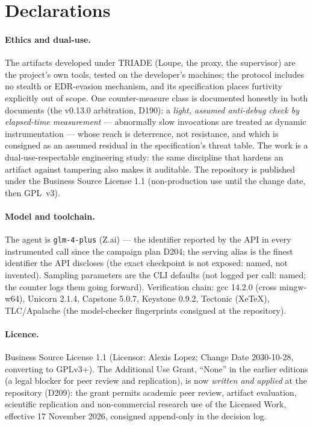 \documentclass[11pt,a4paper]{article}
\newcommand{\code}[1]{\texttt{\small #1}}
\begin{document}
\section*{Declarations}

\paragraph{Ethics and dual-use.} The artifacts developed under TRIADE
(Loupe, the proxy, the supervisor) are the project's own tools, tested on
the developer's machines; the protocol includes no stealth or
EDR-evasion mechanism, and its specification places furtivity explicitly
out of scope. One counter-measure class is documented honestly in both
documents (the v0.13.0 arbitration, D190): a \emph{light, assumed
anti-debug check by elapsed-time measurement} --- abnormally slow
invocations are treated as dynamic instrumentation --- whose reach is
deterrence, not resistance, and which is consigned as an assumed residual
in the specification's threat table. The work is a dual-use-respectable
engineering study: the same discipline that hardens an artifact against
tampering also makes it auditable. The repository is published under the
Business Source License 1.1 (non-production use until the change date,
then GPL~v3).

\paragraph{Model and toolchain.} The agent is \code{glm-4-plus}
(Z.ai) --- the identifier reported by the API in every instrumented
call since the campaign plan D204; the serving alias is the finest
identifier the API discloses (the exact checkpoint is not exposed:
named, not invented). Sampling parameters are the CLI defaults (not
logged per call: named; the counter logs them going forward).
Verification chain: gcc 14.2.0 (cross mingw-w64), Unicorn 2.1.4,
Capstone 5.0.7, Keystone 0.9.2, Tectonic (XeTeX), TLC/Apalache (the
model-checker fingerprints consigned at the repository).

\paragraph{Licence.} Business Source License 1.1 (Licensor: Alexis
Lopez; Change Date 2030-10-28, converting to GPLv3+). The Additional
Use Grant, ``None'' in the earlier editions (a legal blocker for peer
review and replication), is now \emph{written and applied} at the
repository (D209): the grant permits academic peer review, artifact
evaluation, scientific replication and non-commercial research use of
the Licensed Work, effective 17 November 2026, consigned append-only
in the decision log.
\end{document}
